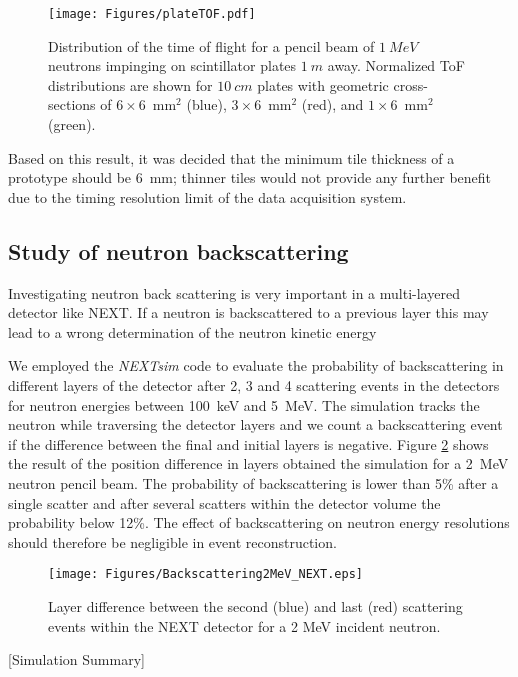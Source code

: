 \begin{figure}[tb]
\centering
\texttt{[image: Figures/plateTOF.pdf]}
\caption{Distribution of the time of flight for a pencil beam of $1~MeV$ neutrons impinging on scintillator plates $1~m$ away. Normalized ToF distributions are shown for $10~cm$ plates with geometric cross-sections of $6 \times 6$~mm$^{2}$ (blue), $3 \times 6$~mm$^{2}$ (red), and $1 \times 6$~mm$^{2}$ (green).}
\label{fig:plateTOF}
\end{figure}
Based on this result, it was decided that the minimum tile thickness of a prototype should be 6~mm; thinner tiles would not provide any further benefit due to the timing resolution limit of the data acquisition system.

\subsection{Study of neutron backscattering}

Investigating neutron back scattering is very important in a multi-layered detector like NEXT. If a neutron is backscattered to a previous layer this may lead to a wrong determination  of the neutron kinetic energy 

We employed the \emph{NEXTsim} code to evaluate the probability of backscattering in different layers of the detector after 2, 3 and 4 scattering events in the detectors for neutron energies between 100~keV and 5~MeV. The simulation tracks the neutron while traversing the detector layers and we count a backscattering event if the difference between the final and initial layers is negative. Figure  \ref{fig:backscattering} shows the result of the position difference in layers obtained the simulation for a 2~MeV neutron pencil beam. The probability of backscattering is lower than 5\% after a single scatter and after several scatters within the detector volume the probability below 12\%. The effect of backscattering on neutron energy resolutions should therefore be negligible in event reconstruction.

\begin{figure}[tb]
\centering
\texttt{[image: Figures/Backscattering2MeV\_NEXT.eps]}
\caption{Layer difference between the second (blue) and last (red) scattering events within the NEXT detector for a 2 MeV incident neutron.}
\label{fig:backscattering}
\end{figure}

\begin{center}
[Simulation Summary]
\end{center}



%
%
%




